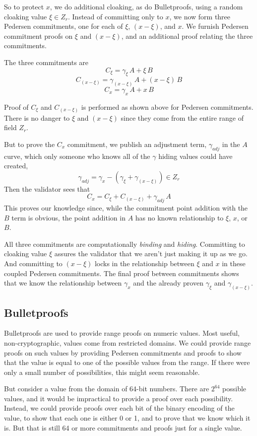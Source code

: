 \documentclass{yellowpaper}
\begin{document}
So to protect  $x$, we do additional cloaking, as do Bulletproofs, using a random cloaking value $\xi \in Z_r$. Instead of committing only to $x$, we now form three Pedersen commitments, one for each of $\xi$, $(x - \xi)$, and $x$. We furnish Pedersen commitment proofs on $\xi$ and $(x-\xi)$, and an additional proof relating the three commitments. 

The three commitments are
$$C_\xi = \gamma_\xi \, A + \xi \, B$$
$$C_{(x-\xi)} = \gamma_{(x-\xi)} \, A + (x - \xi)\, B$$
$$C_x = \gamma_x \, A + x \, B$$

Proof of $C_\xi$ and $C_{(x-\xi)}$ is performed as shown above for Pedersen commitments. There is no danger to $\xi$ and $(x - \xi)$ since they come from the entire range of field $Z_r$. 

But to prove the $C_x$ commitment, we publish an adjustment term, $\gamma_{adj}$ in the $A$ curve, which only someone who knows all of the $\gamma$ hiding values could have created,
$$\gamma_{adj} = \gamma_x - (\gamma_\xi + \gamma_{(x-\xi)}) \in Z_r$$
Then the validator sees that
$$C_x = C_\xi + C_{(x-\xi)} + \gamma_{adj} \, A$$
This proves our knowledge since, while the commitment point addition with the $B$ term is obvious, the point addition in $A$ has no known relationship to $\xi$, $x$, or $B$. 

All three commitments are computationally {\em{binding}} and {\em{hiding}}. Committing to cloaking value $\xi$ assures the validator that we aren't just making it up as we go. And committing to $(x - \xi)$ locks in the relationship between $\xi$ and $x$ in these coupled Pedersen commitments. The final proof between commitments shows that we know the relationship between $\gamma_x$ and the already proven $\gamma_\xi$ and $\gamma_{(x-\xi)}$. 

\subsection{Bulletproofs}
Bulletproofs\cite{bulletproofs} are used to provide range proofs on numeric values. Most useful, non-cryptographic, values  come from restricted domains. We could provide range proofs on such values by providing Pedersen commitments and proofs to show that the value is equal to one of the possible values from the range. If there were only a small number of possibilities, this might seem reasonable.

But consider a value from the domain of 64-bit numbers. There are $2^{64}$ possible values, and it would be impractical to provide a proof over each possibility. Instead, we could provide proofs over each bit of the binary encoding of the value, to show that each one is either 0 or 1, and to prove that we know which it is. But that is still 64 or more commitments and proofs just for a single value.
\end{document}
